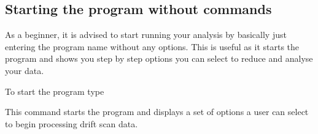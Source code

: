 \documentclass[letterpaper,10pt,english]{sphinxmanual}
\begin{document}
\subsection{Starting the program without commands}
\label{\detokenize{extras/quickstart:starting-the-program-without-commands}}
\sphinxAtStartPar
As a beginner, it is advised to start running your analysis by basically just entering the program name without any options. This is useful as it starts the program and shows you step by step options you can select to reduce and analyse your data.

\sphinxAtStartPar
To start the program type

\begin{sphinxVerbatim}[commandchars=\\\{\}]
\end{sphinxVerbatim}

\sphinxAtStartPar
This command starts the program and displays a set of options a user
can select to begin processing drift scan data.
\end{document}

